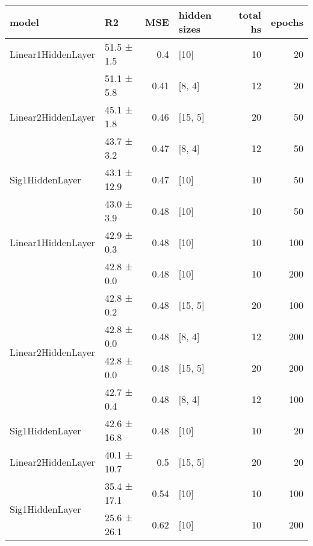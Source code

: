 \begin{longtable}{llrlrr}
\hline
 model                                      & R2          &   MSE & hidden sizes   &   total hs &   epochs \\
\hline
 \hline
Linear1HiddenLayer                  & 51.5 ± 1.5  &  0.4  & [10]           &         10 &       20 \\
 \hline
\multirow{3}{*}{Linear2HiddenLayer} & 51.1 ± 5.8  &  0.41 & [8, 4]         &         12 &       20 \\
                                            & 45.1 ± 1.8  &  0.46 & [15, 5]        &         20 &       50 \\
                                            & 43.7 ± 3.2  &  0.47 & [8, 4]         &         12 &       50 \\
 \hline
Sig1HiddenLayer                     & 43.1 ± 12.9 &  0.47 & [10]           &         10 &       50 \\
 \hline
\multirow{3}{*}{Linear1HiddenLayer} & 43.0 ± 3.9  &  0.48 & [10]           &         10 &       50 \\
                                            & 42.9 ± 0.3  &  0.48 & [10]           &         10 &      100 \\
                                            & 42.8 ± 0.0  &  0.48 & [10]           &         10 &      200 \\
 \hline
\multirow{4}{*}{Linear2HiddenLayer} & 42.8 ± 0.2  &  0.48 & [15, 5]        &         20 &      100 \\
                                            & 42.8 ± 0.0  &  0.48 & [8, 4]         &         12 &      200 \\
                                            & 42.8 ± 0.0  &  0.48 & [15, 5]        &         20 &      200 \\
                                            & 42.7 ± 0.4  &  0.48 & [8, 4]         &         12 &      100 \\
 \hline
Sig1HiddenLayer                     & 42.6 ± 16.8 &  0.48 & [10]           &         10 &       20 \\
 \hline
Linear2HiddenLayer                  & 40.1 ± 10.7 &  0.5  & [15, 5]        &         20 &       20 \\
 \hline
\multirow{2}{*}{Sig1HiddenLayer}    & 35.4 ± 17.1 &  0.54 & [10]           &         10 &      100 \\
                                            & 25.6 ± 26.1 &  0.62 & [10]           &         10 &      200 \\
\hline
\end{longtable}
